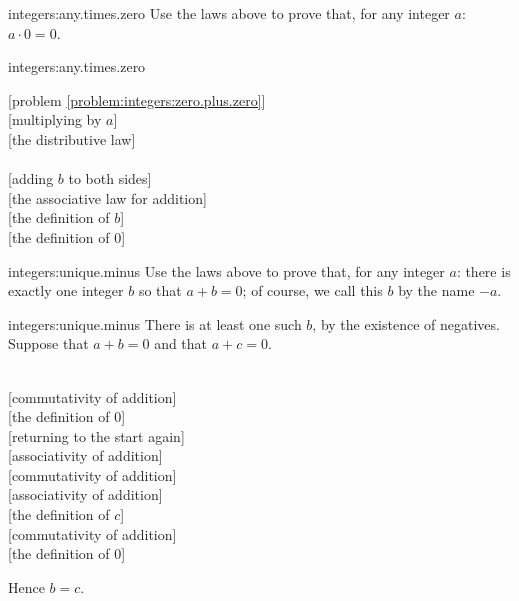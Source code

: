 \begin{problem}{integers:any.times.zero}
Use the laws above to prove that, for any integer \(a\): \(a \cdot 0=0\).
\end{problem}
\begin{answer}{integers:any.times.zero}
\begin{twocolumnproof}
[problem \ref{problem:integers:zero.plus.zero}] \\
[multiplying by \(a\)] \\
[the distributive law] \\
 \\
[adding \(b\) to both sides] \\
[the associative law for addition] \\
[the definition of \(b\)] \\
[the definition of \(0\)]
\end{twocolumnproof}
\end{answer}

\begin{problem}{integers:unique.minus}
Use the laws above to prove that, for any integer \(a\): there is exactly one integer \(b\) so that \(a+b=0\); of course, we call this \(b\) by the name \(-a\).
\end{problem}
\begin{answer}{integers:unique.minus}
There is at least one such \(b\), by the existence of negatives.
Suppose that \(a+b=0\) and that \(a+c=0\).
\begin{twocolumnproof}
 \\
[commutativity of addition] \\
[the definition of \(0\)] \\
[returning to the start again] \\
[associativity of addition] \\
[commutativity of addition] \\
[associativity of addition] \\
[the definition of \(c\)] \\
[commutativity of addition] \\
[the definition of \(0\)]
\end{twocolumnproof}
Hence \(b=c\).
\end{answer}



